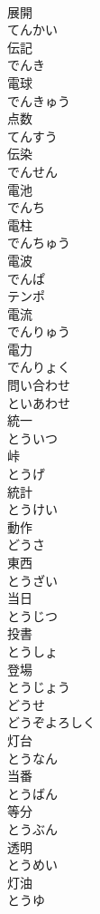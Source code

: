 \documentclass[8pt]{extreport}
\begin{document}
\begin{CJK}{UTF8}{min}
\\	展開 
\\	てんかい	
\\	伝記 
\\	でんき	
\\	電球 
\\	でんきゅう	
\\	点数 
\\	てんすう	
\\	伝染 
\\	でんせん	
\\	電池 
\\	でんち	
\\	電柱 
\\	でんちゅう	
\\	電波 
\\	でんぱ	
\\	テンポ	
\\	電流 
\\	でんりゅう	
\\	電力 
\\	でんりょく	
\\	問い合わせ 
\\	といあわせ	
\\	統一 
\\	とういつ	
\\	峠 
\\	とうげ	
\\	統計 
\\	とうけい	
\\	動作 
\\	どうさ	
\\	東西 
\\	とうざい	
\\	当日 
\\	とうじつ	
\\	投書 
\\	とうしょ	
\\	登場 
\\	とうじょう	
\\	どうせ	
\\	どうぞよろしく	
\\	灯台 
\\	とうなん	
\\	当番 
\\	とうばん	
\\	等分 
\\	とうぶん	
\\	透明 
\\	とうめい	
\\	灯油 
\\	とうゆ	

\end{CJK}
\end{document}
